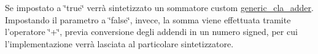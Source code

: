 Se impostato a \char`\"{}true\char`\"{} verrà sintetizzato un sommatore custom \hyperlink{classgeneric__cla__adder}{generic\+\_\+cla\+\_\+adder}. Impostando il parametro a \char`\"{}false\char`\"{}, invece, la somma viene effettuata tramite l'operatore \char`\"{}+\char`\"{}, previa conversione degli addendi in un numero signed, per cui l'implementazione verrà lasciata al particolare sintetizzatore. 

